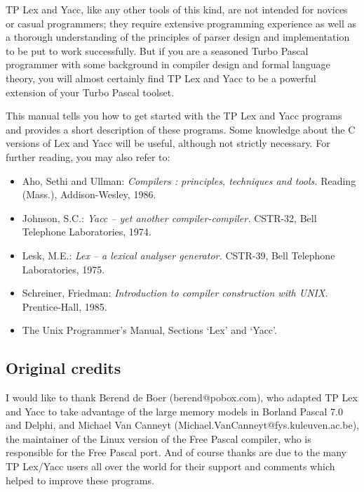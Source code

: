 \documentclass[a4paper]{article}
\begin{document}
TP Lex and Yacc, like any other tools of this kind, are not intended for
novices or casual programmers; they require extensive programming experience
as well as a thorough understanding of the principles of parser design and
implementation to be put to work successfully. But if you are a seasoned
Turbo Pascal programmer with some background in compiler design and formal
language theory, you will almost certainly find TP Lex and Yacc to be a
powerful extension of your Turbo Pascal toolset.

This manual tells you how to get started with the TP Lex and Yacc programs
and provides a short description of these programs. Some knowledge about
the C versions of Lex and Yacc will be useful, although not strictly
necessary. For further reading, you may also refer to:

\begin{itemize}
   \item
      Aho, Sethi and Ullman: {\em Compilers : principles, techniques and
      tools.\/} Reading (Mass.), Addison-Wesley, 1986.
   \item
      Johnson, S.C.: {\em Yacc -- yet another compiler-compiler.\/} CSTR-32,
      Bell Telephone Laboratories, 1974.
   \item
      Lesk, M.E.: {\em Lex -- a lexical analyser generator.\/} CSTR-39, Bell
      Telephone Laboratories, 1975.
   \item
      Schreiner, Friedman: {\em Introduction to compiler construction with
      UNIX.\/} Prentice-Hall, 1985.
   \item
      The Unix Programmer's Manual, Sections `Lex' and `Yacc'.
\end{itemize}

\subsection{Original credits}

I would like to thank Berend de Boer (berend@pobox.com), who adapted TP Lex
and Yacc to take advantage of the large memory models in Borland Pascal 7.0
and Delphi, and Michael Van Canneyt (Michael.VanCanneyt@fys.kuleuven.ac.be),
the maintainer of the Linux version of the Free Pascal compiler, who is
responsible for the Free Pascal port. And of course thanks are due to the many
TP Lex/Yacc users all over the world for their support and comments which
helped to improve these programs.
\end{document}

